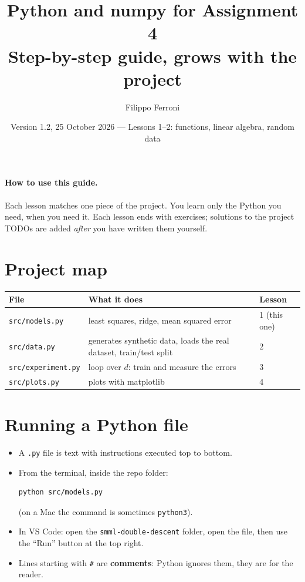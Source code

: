 \documentclass[11pt,a4paper]{article}
\title{Python and numpy for Assignment 4\\\large Step-by-step guide, grows with the project}
\author{Filippo Ferroni}
\date{Version 1.2, 25 October 2026 --- Lessons 1--2: functions, linear algebra, random data}
\begin{document}
\maketitle

\paragraph{How to use this guide.}
Each lesson matches one piece of the project. You learn only the Python you need, when you need it.
Each lesson ends with exercises; solutions to the project TODOs are added \emph{after} you have written them yourself.

\tableofcontents

\section{Project map}
\begin{center}
\begin{tabular}{@{}lll@{}}
\toprule
File & What it does & Lesson \\
\midrule
\texttt{src/models.py} & least squares, ridge, mean squared error & 1 (this one) \\
\texttt{src/data.py} & generates synthetic data, loads the real dataset, train/test split & 2 \\
\texttt{src/experiment.py} & loop over $d$: train and measure the errors & 3 \\
\texttt{src/plots.py} & plots with matplotlib & 4 \\
\bottomrule
\end{tabular}
\end{center}

\section{Running a Python file}
\begin{itemize}
  \item A \texttt{.py} file is text with instructions executed top to bottom.
  \item From the terminal, inside the repo folder:
\begin{lstlisting}
python src/models.py
\end{lstlisting}
        (on a Mac the command is sometimes \texttt{python3}).
  \item In VS Code: open the \texttt{smml-double-descent} folder, open the file, then use the ``Run'' button at the top right.
  \item Lines starting with \texttt{\#} are \textbf{comments}: Python ignores them, they are for the reader.
\end{itemize}
\end{document}
